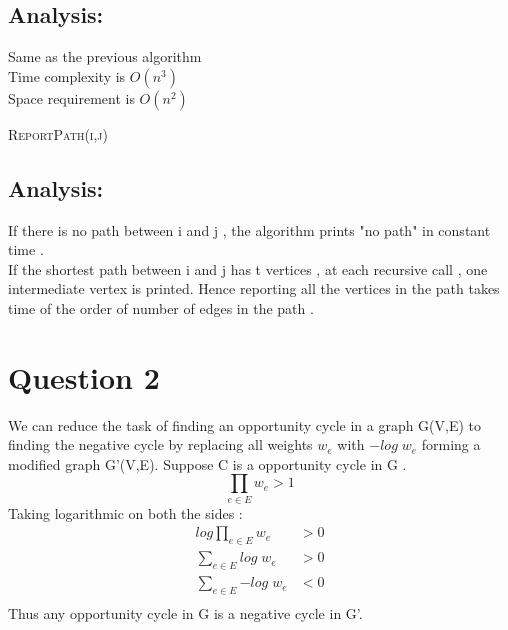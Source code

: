 \documentclass[11pt]{article}
\begin{document}
\subsection*{Analysis: }
Same as the previous algorithm\\
Time complexity is $O(n^3)$ \\
Space requirement is $O(n^2)$ \\
\linesnumbered
\begin{algorithm}
\caption{\textsc{ReportPath(i,j)}}
\end{algorithm}

\subsection*{Analysis: }
If there is no path between i and j , the algorithm prints "no path" in constant time . \\
If the shortest path between i and j has t vertices , at each recursive call , one intermediate vertex is printed.
Hence reporting all the vertices in the path takes time of the order of number of edges in the path .\\

\section*{Question 2}
We can reduce the task of finding an opportunity cycle in a graph G(V,E) to finding the negative cycle by replacing all weights $w_e$ with $-log \; w_e$
forming a modified graph G'(V,E). Suppose C is a opportunity cycle in G . 
\[ \prod_{e \in E} {w_e} > 1 \]
Taking logarithmic on both the sides :
\begin{align*}
log \prod_{e \in E} {w_e} &> 0 \\
\sum_{e \in E} {log \; w_e} &> 0 \\
\sum_{e \in E} {-log \; w_e} &< 0 \\
\end{align*}
Thus any opportunity cycle in G is a negative cycle in G'. 
\end{document}
